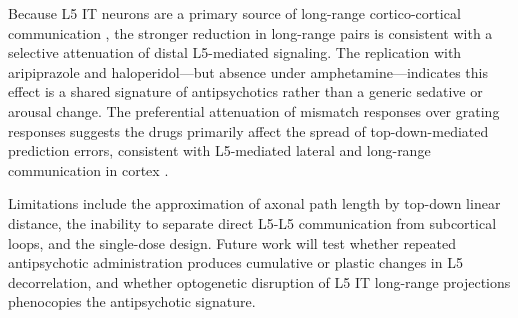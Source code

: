 \documentclass[11pt]{article}
\begin{document}
Because L5 IT neurons are a primary source of long-range cortico-cortical communication \cite{chen2019empty,harris2019hierarchical,leinweber2017sensorimotor}, the stronger reduction in long-range pairs is consistent with a selective attenuation of distal L5-mediated signaling. The replication with aripiprazole and haloperidol---but absence under amphetamine---indicates this effect is a shared signature of antipsychotics rather than a generic sedative or arousal change. The preferential attenuation of mismatch responses over grating responses suggests the drugs primarily affect the spread of top-down-mediated prediction errors, consistent with L5-mediated lateral and long-range communication in cortex \cite{jordan2020layer}.

Limitations include the approximation of axonal path length by top-down linear distance, the inability to separate direct L5-L5 communication from subcortical loops, and the single-dose design. Future work will test whether repeated antipsychotic administration produces cumulative or plastic changes in L5 decorrelation, and whether optogenetic disruption of L5 IT long-range projections phenocopies the antipsychotic signature.



\end{document}
